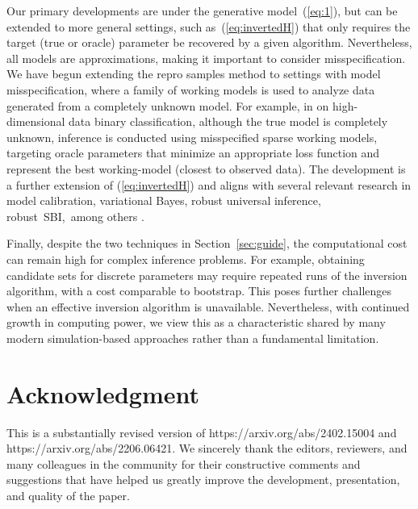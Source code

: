 \documentclass[12pt]{article}
\theoremstyle{shortspace}
\begin{document}
Our primary developments are under the generative model~(\ref{eq:1}), but can be extended to more general settings, such as~(\ref{eq:invertedH}) that only requires  the target (true or oracle) parameter be recovered by a given algorithm. Nevertheless, all models are approximations, making it important to consider misspecification.
We have begun extending the repro samples method to settings with model misspecification, where a family of working models is used to analyze data generated from a completely unknown model. For example, in \cite{hou2025repro} on high-dimensional data binary
classification,  although the true model is completely unknown, inference is conducted using misspecified sparse working models, targeting oracle parameters that minimize an appropriate loss function and represent the best working-model  (closest to observed data). The development is a further extension of (\ref{eq:invertedH}) and aligns with several relevant research in model calibration, variational Bayes,   robust universal inference, robust~SBI,~among others \citep[e.g.,][]{smith2007calibration,  wang2019variational, park2023robust, tomaselli2025robustsimulationbasedinference}.  



Finally, despite the two techniques in Section~\ref{sec:guide}, the computational cost can remain high for complex inference problems. For example, obtaining candidate sets for discrete parameters may require repeated runs of the inversion algorithm, with a cost comparable to bootstrap. This poses further challenges when an effective inversion algorithm is unavailable. Nevertheless, with continued growth in computing power, we view this as a characteristic shared by many modern simulation-based approaches rather than a fundamental limitation.







\section*{Acknowledgment} 
This is a substantially revised version of  https://arxiv.org/abs/2402.15004 and \\ https://arxiv.org/abs/2206.06421. 
We sincerely thank the editors, reviewers, and many colleagues in the community for their constructive comments and suggestions that have helped us greatly improve the development, presentation, and quality of the paper. 


\end{document}
